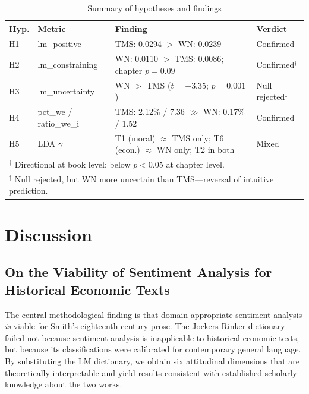 \documentclass[12pt,a4paper]{article}
\begin{document}
\begin{table}[H]
\centering
\caption{Summary of hypotheses and findings}
\label{tab:hypotheses}
\small
\begin{tabularx}{\textwidth}{llXl}
\toprule
Hyp. & Metric & Finding & Verdict \\
\midrule
H1 & lm\_positive & TMS: 0.0294 $>$ WN: 0.0239 & Confirmed \\
H2 & lm\_constraining & WN: 0.0110 $>$ TMS: 0.0086; chapter $p=0.09$ & Confirmed$^\dagger$ \\
H3 & lm\_uncertainty & WN $>$ TMS ($t=-3.35$; $p=0.001$) & Null rejected$^\ddagger$ \\
H4 & pct\_we / ratio\_we\_i & TMS: 2.12\% / 7.36 $\gg$ WN: 0.17\% / 1.52 & Confirmed \\
H5 & LDA $\gamma$ & T1 (moral) $\approx$ TMS only; T6 (econ.) $\approx$ WN only; T2 in both & Mixed \\
\midrule
\multicolumn{4}{l}{\small $^\dagger$ Directional at book level; below $p<0.05$ at chapter level.} \\
\multicolumn{4}{l}{\small $^\ddagger$ Null rejected, but WN more uncertain than TMS---reversal of intuitive prediction.} \\
\bottomrule
\end{tabularx}
\end{table}

\section{Discussion}

\subsection{On the Viability of Sentiment Analysis for Historical
Economic Texts}

The central methodological finding is that domain-appropriate sentiment
analysis \textit{is} viable for Smith's eighteenth-century prose.
The Jockers-Rinker dictionary failed not because sentiment analysis is
inapplicable to historical economic texts, but because its classifications
were calibrated for contemporary general language.
By substituting the LM dictionary, we obtain six attitudinal dimensions
that are theoretically interpretable and yield results consistent with
established scholarly knowledge about the two works.
\end{document}
